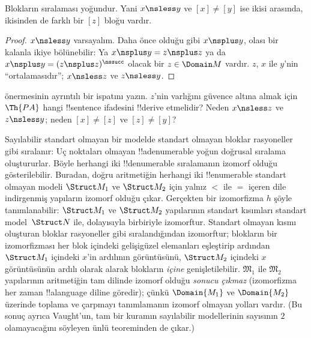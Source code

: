 \documentclass[../../../include/open-logic-section]{subfiles}
\begin{document}
\begin{prop}
Blokların sıralaması yoğundur. Yani $x\nsless y$ ve $[x]\neq[y]$ ise
ikisi arasında, ikisinden de farklı bir $[z]$ bloğu vardır.
\end{prop}

\begin{proof}
$x\nsless y$ varsayalım. Daha önce olduğu gibi $x\nsplus y$, olası bir
kalanla ikiye bölünebilir: Ya $x\nsplus y=z\nsplus z$ ya da
$x\nsplus y=(z\nsplus z)^\nssucc$ olacak bir $z\in\Domain M$ vardır.
$z$, $x$ ile $y$'nin ``ortalamasıdır''; $x\nsless z$ ve
$z\nsless y$.
\end{proof}

\begin{prob}
 önermesinin ayrıntılı bir
ispatını yazın. $z$'nin varlığını güvence altına almak için $\Th{PA}$
hangi !!{sentence} ifadesini !!{derive} etmelidir? Neden
$x\nsless z$ ve $z\nsless y$; neden $[x]\neq[z]$ ve $[z]\neq[y]$?
\end{prob}

\begin{explain}
Sayılabilir standart olmayan bir modelde standart olmayan bloklar
rasyoneller gibi sıralanır: Uç noktaları olmayan !!a{denumerable}
yoğun doğrusal sıralama oluştururlar. Böyle herhangi iki
!!{denumerable} sıralamanın izomorf olduğu gösterilebilir. Buradan,
doğru aritmetiğin herhangi iki !!{enumerable} standart olmayan modeli
$\Struct M_1$ ve $\Struct M_2$ için yalnız $<$ ile $=$ içeren dile
indirgenmiş yapıların izomorf olduğu çıkar. Gerçekten bir izomorfizma
$h$ şöyle tanımlanabilir: $\Struct M_1$ ve $\Struct M_2$ yapılarının
standart kısımları standart model~$\Struct N$ ile, dolayısıyla
birbiriyle izomorftur. Standart olmayan kısmı oluşturan bloklar
rasyoneller gibi sıralandığından izomorftur; blokların bir izomorfizması
her blok içindeki gelişigüzel elemanları eşleştirip ardından
$\Struct M_1$ içindeki $x$'in ardılının görüntüsünü, $\Struct M_2$
içindeki $x$ görüntüsünün ardılı olarak alarak blokların \emph{içine}
genişletilebilir. $\mathfrak M_1$ ile $\mathfrak M_2$ yapılarının
aritmetiğin tam dilinde izomorf olduğu \emph{sonucu çıkmaz} (izomorfizma
her zaman !!a{language} diline göredir); çünkü $\Domain{M_1}$ ve
$\Domain{M_2}$ üzerinde toplama ve çarpmayı tanımlamanın izomorf olmayan
yolları vardır. (Bu sonuç ayrıca Vaught'un, tam bir kuramın sayılabilir
modellerinin sayısının $2$ olamayacağını söyleyen ünlü teoreminden de
çıkar.)
\end{explain}
\end{document}
